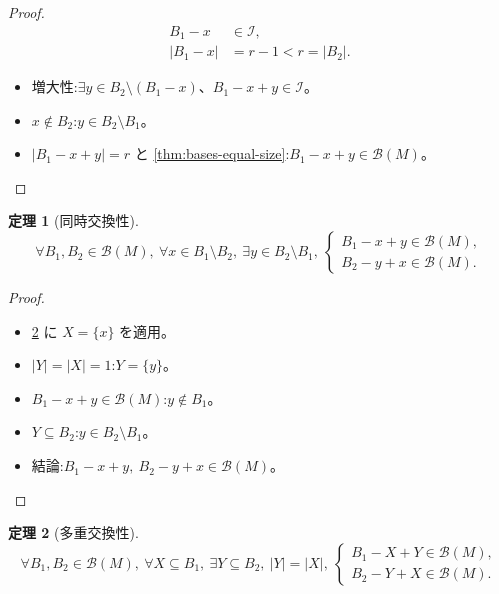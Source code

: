 \documentclass[a4paper, 11pt, dvipdfmx]{jsarticle}
\newtheorem{theorem}{定理}
\theoremstyle{definition}
\begin{document}
\begin{proof}
\begin{align*}
  B_1 - x &\in \mathcal{I}, \\
  \lvert B_1 - x \rvert &= r-1 < r = \lvert B_2 \rvert.
\end{align*}
\begin{itemize}
  \item 増大性:$\exists y \in B_2 \setminus (B_1 - x)$、$B_1 - x + y \in \mathcal{I}$。
  \item $x \notin B_2$:$y \in B_2 \setminus B_1$。
  \item $\lvert B_1 - x + y \rvert = r$ と \cref{thm:bases-equal-size}:$B_1 - x + y \in \mathcal{B}(M)$。
\end{itemize}
\end{proof}

\begin{theorem}[同時交換性]
\label{thm:symmetric-basis-exchange}
\begin{equation*}
  \forall B_1, B_2 \in \mathcal{B}(M),\
  \forall x \in B_1 \setminus B_2,\
  \exists y \in B_2 \setminus B_1,\
  \begin{cases}
    B_1 - x + y \in \mathcal{B}(M), \\
    B_2 - y + x \in \mathcal{B}(M).
  \end{cases}
\end{equation*}
\end{theorem}
\begin{proof}
\begin{itemize}
  \item \cref{thm:multiple-symmetric-basis-exchange} に $X = \{x\}$ を適用。
  \item $\lvert Y \rvert = \lvert X \rvert = 1$:$Y = \{y\}$。
  \item $B_1 - x + y \in \mathcal{B}(M)$:$y \notin B_1$。
  \item $Y \subseteq B_2$:$y \in B_2 \setminus B_1$。
  \item 結論:$B_1 - x + y,\ B_2 - y + x \in \mathcal{B}(M)$。
\end{itemize}
\end{proof}

\begin{theorem}[多重交換性]
\label{thm:multiple-symmetric-basis-exchange}
\begin{equation*}
  \forall B_1, B_2 \in \mathcal{B}(M),\
  \forall X \subseteq B_1,\
  \exists Y \subseteq B_2,\
  \lvert Y \rvert = \lvert X \rvert,\
  \begin{cases}
    B_1 - X + Y \in \mathcal{B}(M), \\
    B_2 - Y + X \in \mathcal{B}(M).
  \end{cases}
\end{equation*}
\end{theorem}
\end{document}
